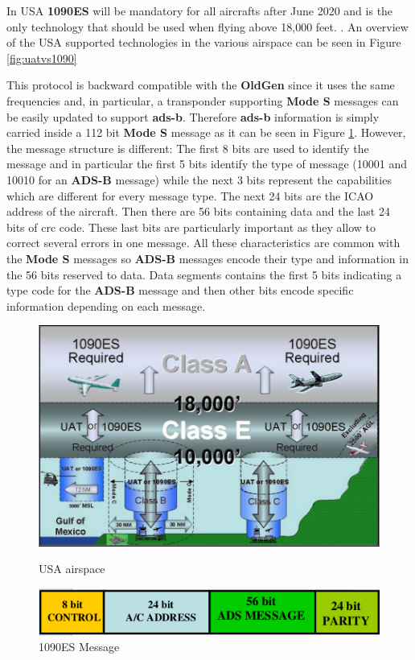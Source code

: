 \documentclass[../main.tex]{subfiles}
\begin{document}
In USA \textbf{1090ES} will be mandatory for all aircrafts after June 2020 and is the only technology that should be used when flying above 18,000 feet.
\cite{title14}. An overview of the USA supported technologies in the various airspace can be seen in Figure \ref{fig:uatvs1090}

This protocol is backward compatible with the \textbf{OldGen} since it uses the same frequencies and, in particular, a transponder supporting \textbf{Mode S} messages can be easily updated to support \textbf{\acrshort{ads-b}}. Therefore \textbf{\acrshort{ads-b}} information is simply carried inside a 112 bit \textbf{Mode S} message as it can be seen in Figure \ref{fig:1090es}. However, the message structure is different: The first 8 bits are used to identify the message and in particular the first 5 bits identify the type of message (10001 and 10010 for an \textbf{ADS-B} message) while the next 3 bits represent the capabilities which are different for every message type. The next 24 bits are the ICAO address of the aircraft. Then there are 56 bits containing data and the last 24 bits of \acrshort{crc} code. These last bits are particularly important as they allow to correct several errors in one message. All these characteristics are common with the \textbf{Mode S} messages so \textbf{ADS-B} messages encode their type and information in the 56 bits reserved to data. Data segments contains the first 5 bits indicating a type code for the \textbf{ADS-B} message and then other bits encode specific information depending on each message.\cite{modesbook}


\begin{figure}[htp]
\centering
\begin{minipage}{.5\textwidth}
  \centering
  \includegraphics[scale=0.35]{images/uatvs1090.png}
  \caption{USA airspace}
  \label{fig:uatvs1090}
\end{minipage}%
\begin{minipage}{.5\textwidth}
  \centering
  \includegraphics[scale=0.45]{images/1090es.png}
  \caption{1090ES Message}
  \label{fig:1090es}
\end{minipage}
\end{figure}
\end{document}
